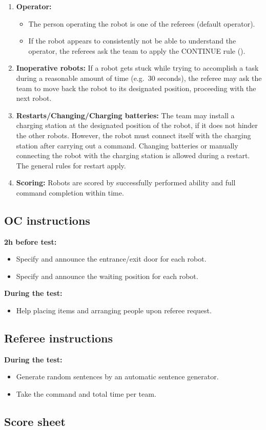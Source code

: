 \begin{enumerate}
	\item \textbf{Operator:}
	\begin{itemize}
		\item The person operating the robot is one of the referees (default operator).
		\item If the robot appears to consistently not be able to understand the operator, the referees ask the team to apply the CONTINUE rule ().
	\end{itemize}

	\item \textbf{Inoperative robots:} If a robot gets stuck while trying to accomplish a task during a reasonable amount of time (e.g.~30 seconds), the referee may ask the team to move back the robot to its designated position, proceeding with the next robot. \\

	\item \textbf{Restarts/Changing/Charging batteries:} The team may install a charging station at the designated position of the robot, if it does not hinder the other robots. However, the robot must connect itself with the charging station after carrying out a command. Changing batteries or manually connecting the robot with the charging station is allowed during a restart. The general rules for restart apply. \\

	\item \textbf{Scoring:} Robots are scored by successfully performed ability and full command completion within time. 
\end{enumerate}

\subsection{OC instructions}
\textbf{2h before test:}
\begin{itemize}
	\item Specify and announce the entrance/exit door for each robot. 
	\item Specify and announce the waiting position for each robot. 
\end{itemize}
\textbf{During the test:}
\begin{itemize}
	\item Help placing items and arranging people upon referee request.
\end{itemize}

\subsection{Referee instructions}
\textbf{During the test:}
\begin{itemize}
	\item Generate random sentences by an automatic sentence generator.
	\item Take the command and total time per team.
\end{itemize}


\newpage
\subsection{Score sheet}


 
